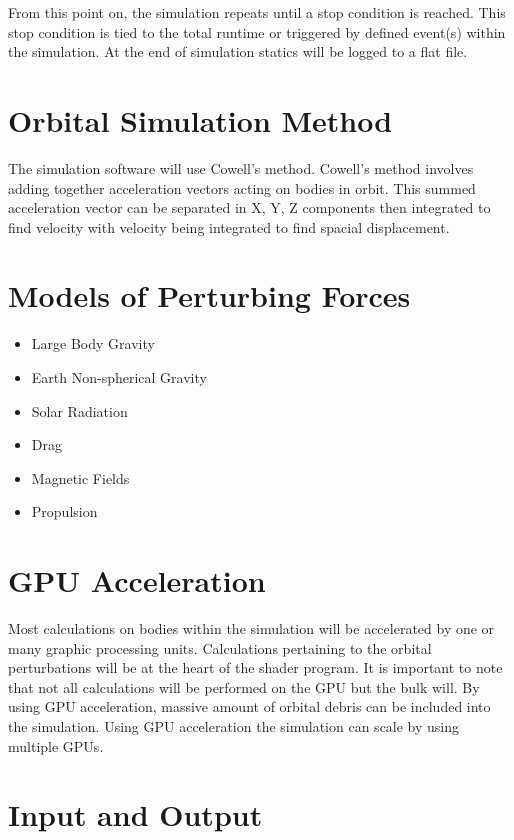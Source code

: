 \documentclass{article}
\begin{document}
  From this point on, the simulation repeats until a stop condition is reached. This stop condition is tied to the total runtime or triggered by defined event(s) within the simulation. At the end of simulation statics will be logged to a flat file.
  
  \section{Orbital Simulation Method}
  
  The simulation software will use Cowell’s method. Cowell’s method involves adding together acceleration vectors acting on bodies in orbit. This summed acceleration vector can be separated in X, Y, Z components then integrated to find velocity with velocity being integrated to find spacial displacement. 
  
  \section{Models of Perturbing Forces}
  
  \begin{itemize}
  	\item Large Body Gravity
  	\item Earth Non-spherical Gravity
  	\item Solar Radiation
  	\item Drag
  	\item Magnetic Fields
  	\item Propulsion
  \end{itemize}
  
  
  \section{GPU Acceleration}
  
	Most calculations on bodies within the simulation will be accelerated by one or many graphic processing units. Calculations pertaining to the orbital perturbations will be at the heart of the shader program. It is important to note that not all calculations will be performed on the GPU but the bulk will. By using GPU acceleration, massive amount of orbital debris can be included into the simulation. Using GPU acceleration the simulation can scale by using multiple GPUs.
  
  \section{Input and Output}
  
\end{document}

